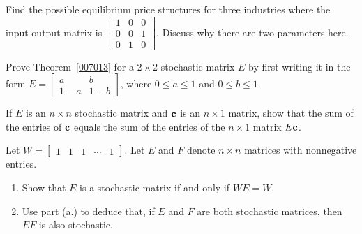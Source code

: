 \documentclass{ximera}
\begin{document}
\begin{problem}\label{prob:i/o_6}
Find the possible equilibrium price structures for three industries where the input-output matrix is $\begin{bmatrix}
1 & 0 & 0 \\
0 & 0 & 1 \\
0 & 1 & 0
\end{bmatrix}$. Discuss why there are two parameters here.
\end{problem}

\begin{problem}\label{prob:2x2proof}
Prove Theorem~\ref{007013} for a $2 \times 2$ stochastic matrix $E$ by first writing it in the form $E = \begin{bmatrix}
a & b \\
1 - a & 1 - b
\end{bmatrix}$, where $0 \leq a \leq 1$ and $0 \leq b \leq 1$.

\end{problem}

\begin{problem}\label{prob:i/o_7}
If $E$ is an $n \times n$ stochastic matrix and ${\bf c}$ is an $n \times 1$ matrix, show that the sum of the entries of ${\bf c}$ equals the sum of the entries of the $n \times 1$ matrix $E{\bf c}$.
\end{problem}

\begin{problem}\label{prob:i/o_8}
Let $W = \begin{bmatrix}
1 & 1 & 1 & \cdots & 1
\end{bmatrix}$. Let $E$ and $F$ denote $n \times n$ matrices with nonnegative entries.

\begin{enumerate}
    \item Show that $E$ is a stochastic matrix if and only if $WE = W$.
    \item Use part (a.) to deduce that, if $E$ and $F$ are both stochastic matrices, then $EF$ is also stochastic.
\end{enumerate}
\end{problem} 
\end{document}
